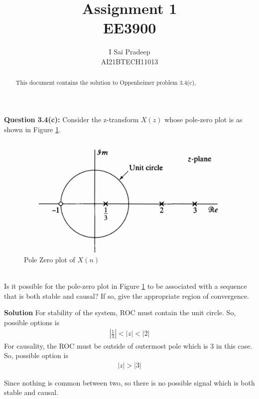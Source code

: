 \documentclass[journal,12pt,two column]{IEEEtran}
\begin{document}
	\title{\huge{Assignment 1}\\EE3900}
	\author{\Large{I Sai Pradeep}\\AI21BTECH11013}
	\maketitle
    
	\begin{abstract}
	This document contains the solution to Oppenheimer problem 3.4(c),
	\end{abstract}
	\noindent \textbf{Question 3.4(c):}
Consider the z-transform $X(z)$ whose pole-zero plot is as shown in Figure \ref{fig:pole_zero_plt}.
\begin{figure}[!ht]
	\centering
	\includegraphics[width=\columnwidth]{./figs/pole_zero_plt}
	\caption{Pole Zero plot of $X(n)$}
	\label{fig:pole_zero_plt}
	\end{figure}
 \\
Is it possible for the pole-zero plot in Figure \ref{fig:pole_zero_plt} to be associated with a sequence that is both stable and causal? If so, give the appropriate region of convergence.
	
		\textbf{Solution} For stability of the system, ROC must contain the unit circle. So, possible options is 
		\begin{align}
			|\frac{1}{3}|<|z|<|2|
		\end{align}
		For causality, the ROC must be outside of outermost pole which is 3 in this case. So, possible option is
		\begin{align}
			|z|>|3|
		\end{align}

		Since nothing is common between two, so there is no possible signal which is both stable and causal.
\end{document}
